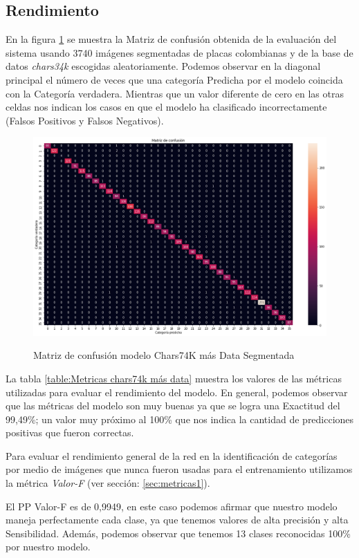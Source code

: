 \subsection*{Rendimiento}

En la figura \ref{fig:matriz de confusion chars74k más data} se muestra la Matriz de confusión obtenida de la evaluación del sistema usando 3740 imágenes segmentadas de placas colombianas y de la base de datos \textit{chars34k} escogidas aleatoriamente. Podemos observar en la diagonal principal el número de veces que una categoría Predicha por el modelo coincida con la Categoría verdadera. Mientras que un valor diferente de cero en las otras celdas nos indican los casos en que el modelo ha clasificado incorrectamente (Falsos Positivos y Falsos Negativos).

\begin{figure}[H]
\centering
  {\includegraphics[width=0.5\linewidth]{imagenes/MODELO_4/matriz_de_confusion.png}}
  \caption{Matriz de confusión modelo Chars74K más Data Segmentada}
   \label{fig:matriz de confusion chars74k más data}  
\end{figure}

La tabla \ref{table:Metricas chars74k más data} muestra los valores de las métricas utilizadas para evaluar el rendimiento del modelo. En general, podemos observar que las métricas del modelo son muy buenas ya que se logra una  Exactitud del 99,49\%; un valor muy próximo al 100\% que nos indica  la cantidad de predicciones positivas que fueron correctas. 

Para evaluar el rendimiento general de la red en la identificación de categorías por medio de imágenes que nunca fueron usadas para el entrenamiento utilizamos la métrica \textit{Valor-F} (ver sección: \ref{sec:metricas1}).

El PP Valor-F es de 0,9949,  en este caso podemos afirmar que nuestro modelo maneja perfectamente cada clase, ya que tenemos valores de alta precisión y alta Sensibilidad. Además, podemos observar que tenemos 13 clases reconocidas 100\% por nuestro modelo.\\

